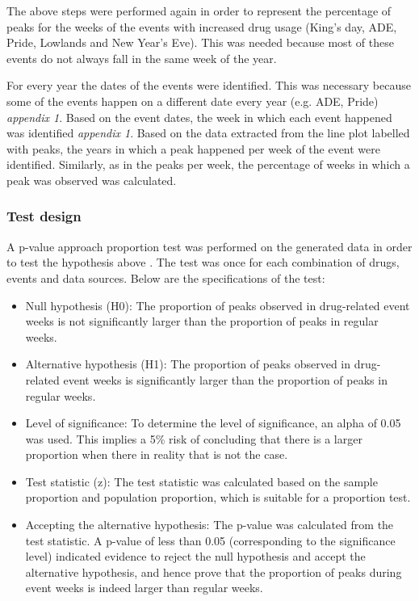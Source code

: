 The above steps were performed again in order to represent the
percentage of peaks for the weeks of the events with increased
drug usage (King’s day, ADE, Pride, Lowlands and New Year’s
Eve). This was needed because most of these events do not always
fall in the same week of the year.

For every year the dates of the events were identified. This was
necessary because some of the events happen on a different date
every year (e.g. ADE, Pride) \textit{appendix 1}. Based
on the event dates, the week in which each event happened was
identified \textit{appendix 1}. Based on the data extracted from the
line plot labelled with peaks, the years in which a peak
happened per week of the event were identified. Similarly, as in
the peaks per week, the percentage of weeks in which a peak was
observed was calculated.

\subsubsection{Test design}

A p-value approach proportion test was performed on the
generated data in order to test the hypothesis above
\cite{dialsingh}. The test was once for each combination of
drugs, events and data sources. Below are the specifications of
the test:

\begin{itemize}
  \item Null hypothesis (H0): The proportion of peaks observed
  in drug-related event weeks is not significantly larger than
  the proportion of peaks in regular weeks.
  \item Alternative hypothesis (H1): The proportion of peaks
  observed in drug-related event weeks is significantly larger
  than the proportion of peaks in regular weeks.
  \item Level of significance: To determine the level of
  significance, an alpha of 0.05 was used. This implies a 5\%
  risk of concluding that there is a larger proportion when
  there in reality that is not the case.
  \item Test statistic (z): The test statistic was calculated
  based on the sample proportion and population proportion, which is suitable for a proportion test. 
  \item Accepting the alternative hypothesis: The p-value was
  calculated from the test statistic. A p-value of less than
  0.05 (corresponding to the significance level) indicated
  evidence to reject the null hypothesis and accept the
  alternative hypothesis, and hence prove that the proportion of
  peaks during event weeks is indeed larger than regular weeks.

\end{itemize}

